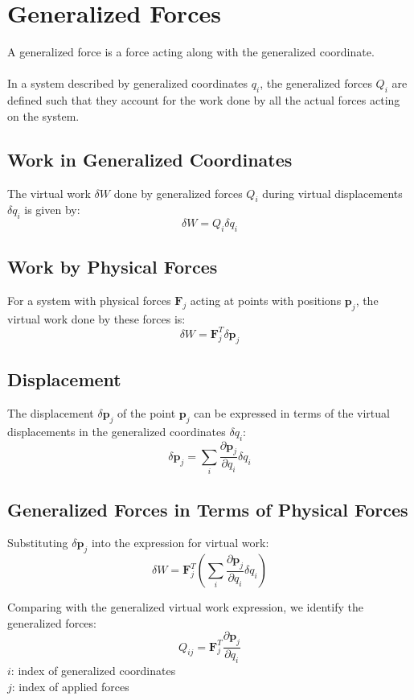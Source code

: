 \section{Generalized Forces}
A generalized force is a force acting along with the generalized coordinate.
\\
\\
In a system described by generalized coordinates $q_i$, the generalized forces $Q_i$ are defined such that they account for the work done by all the actual forces acting on the system.
\subsection{Work in Generalized Coordinates}
The virtual work \( \delta W \) done by generalized forces \( Q_i \) during virtual displacements \( \delta q_i \) is given by:
\[
\delta W =  Q_i \delta q_i
\]


\subsection{Work by Physical Forces}
For a system with physical forces \( \mathbf{F}_j \) acting at points with positions \( \mathbf{p}_j \), the virtual work done by these forces is:
\[
\delta W = \mathbf{F}_j^T \delta \mathbf{p}_j
\]


\subsection{Displacement}
The displacement \( \delta \mathbf{p}_j \) of the point \( \mathbf{p}_j \) can be expressed in terms of the virtual displacements in the generalized coordinates \( \delta q_i \):
\[
\delta \mathbf{p}_j = \sum_{i} \frac{\partial \mathbf{p}_j}{\partial q_i} \delta q_i
\]


\subsection{Generalized Forces in Terms of Physical Forces}
Substituting \( \delta \mathbf{p}_j \) into the expression for virtual work:
\[
\delta W = \mathbf{F}_j^T \left( \sum_{i} \frac{\partial \mathbf{p}_j}{\partial q_i} \delta q_i \right)
\]

Comparing with the generalized virtual work expression, we identify the generalized forces:
\[
Q_{ij} = \mathbf{F}_j^T \frac{\partial \mathbf{p}_j}{\partial q_i}
\]
$i$: index of generalized coordinates 
\\
$j$: index of applied forces

